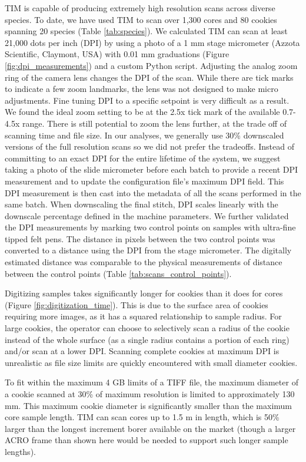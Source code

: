 \documentclass[a4paper,12pt]{article}
\newcommand{\R}[1]{\label{#1}\linelabel{#1}}
\begin{document}
TIM is capable of producing extremely high resolution scans across diverse species. \R{usage_1}To date, we have used TIM to scan over 1,300 cores and 80 cookies spanning 20 species (Table \ref{tab:species}).\R{usage_2}
We calculated TIM can scan at least 21,000 dots per inch (DPI) by using a photo of a 1 mm stage micrometer (Azzota Scientific, Claymont, USA) with 0.01 mm graduations (Figure \ref{fig:dpi_measurements}) and a custom Python script. \R{variable_dpi_1}Adjusting the analog zoom ring of the camera lens changes the DPI of the scan. While there are tick marks to indicate a few zoom landmarks, the lens was not designed to make micro adjustments. Fine tuning DPI to a specific setpoint is very difficult as a result. We found the ideal zoom setting to be at the 2.5x tick mark of the available 0.7-4.5x range. There is still potential to zoom the lens further, at the trade off of scanning time and file size. In our analyses, we generally use 30\% downscaled versions of the full resolution scans so we did not prefer the tradeoffs. Instead of committing to an exact DPI for the entire lifetime of the system, we suggest taking a photo of the slide micrometer before each batch to provide a recent DPI measurement and to update the configuration file's maximum DPI field. This DPI measurement is then cast into the metadata of all the scans performed in the same batch.\R{variable_dpi_2} When downscaling the final stitch, DPI scales linearly with the downscale percentage defined in the machine parameters. We further validated the DPI measurements by marking two control points on samples with ultra-fine tipped felt pens. The distance in pixels between the two control points was converted to a distance using the DPI from the stage micrometer. The digitally estimated distance was comparable to the physical measurements of distance between the control points (Table \ref{tab:scans_control_points}).  

Digitizing samples takes significantly longer for cookies than it does for cores (Figure \ref{fig:digitization_time}). This is due to the surface area of cookies requiring more images, as it has a squared relationship to sample radius.
For large cookies, the operator can choose to selectively scan a radius of the cookie instead of the whole surface (as a single radius contains a portion of each ring) and/or scan at a lower DPI. Scanning complete cookies at maximum DPI is unrealistic as file size limits are quickly encountered with small diameter cookies. 

To fit within the maximum 4 GB limits of a TIFF file, the maximum diameter of a cookie scanned at 30\% of maximum resolution is limited to approximately 130 mm. 
This maximum cookie diameter is significantly smaller than the maximum core sample length. \R{max_length}TIM can scan cores up to 1.5 m in length, which is 50\% larger than the longest increment borer available on the market (though a larger ACRO frame than shown here would be needed to support such longer sample lengths).
\end{document}
